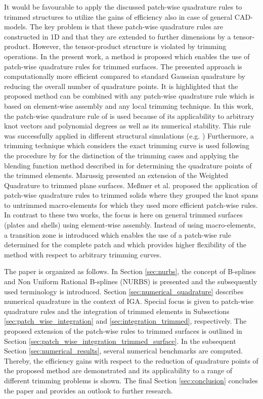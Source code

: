 \documentclass[3p]{elsarticle}
\begin{document}
It would be favourable to apply the discussed patch-wise quadrature rules to trimmed structures to utilize the gains of efficiency also in case of general CAD-models. The key problem is that these patch-wise quadrature rules are constructed in 1D and that they are extended to further dimensions by a tensor-product. However, the tensor-product structure is violated by trimming operations. In the present work, a method is proposed which enables the use of patch-wise quadrature rules for trimmed surfaces. The presented approach is computationally more efficient compared to standard Gaussian quadrature by reducing the overall number of quadrature points. It is highlighted that the proposed method can be combined with any patch-wise quadrature rule which is based on element-wise assembly and any local trimming technique. In this work, the patch-wise quadrature rule of \cite{Johannessen2017} is used because of its applicability to arbitrary knot vectors and polynomial degrees as well as its numerical stability. This rule was successfully applied in different structural simulations (e.g. \cite{Leonetti2019,Leonetti2018a}) Furthermore, a trimming technique which considers the exact trimming curve is used following the procedure by \cite{Kim2009} for the distinction of the trimming cases and applying the blending function method described in \cite{Guo2018} for determining the quadrature points of the trimmed elements. Marussig \cite{Marussig2022} presented an extension of the Weighted Quadrature to trimmed plane surfaces. Meßmer et al. \cite{Messmer2022} proposed the application of patch-wise quadrature rules to trimmed solids where they grouped the knot spans to untrimmed macro-elements for which they used more efficient patch-wise rules. In contrast to these two works, the focus is here on general trimmed surfaces (plates and shells) using element-wise assembly. Instead of using macro-elements, a transition zone is introduced which enables the use of a patch-wise rule determined for the complete patch and which provides higher flexibility of the method with respect to arbitrary trimming curves. \bigskip

The paper is organized as follows. In Section \ref{sec:nurbs}, the concept of B-splines and Non Uniform Rational B-splines (NURBS) is presented and the subsequently used terminology is introduced. Section \ref{sec:numerical_quadrature} describes numerical quadrature in the context of IGA. Special focus is given to patch-wise quadrature rules and the integration of trimmed elements in Subsections \ref{sec:patch_wise_integration} and \ref{sec:integration_trimmed}, respectively. The proposed extension of the patch-wise rules to trimmed surfaces is outlined in Section \ref{sec:patch_wise_integration_trimmed_surface}. In the subsequent Section \ref{sec:numerical_results}, several numerical benchmarks are computed. Thereby, the efficiency gains with respect to the reduction of quadrature points of the proposed method are demonstrated and its applicability to a range of different trimming problems is shown. The final Section \ref{sec:conclusion} concludes the paper and provides an outlook to further research.
\end{document}
